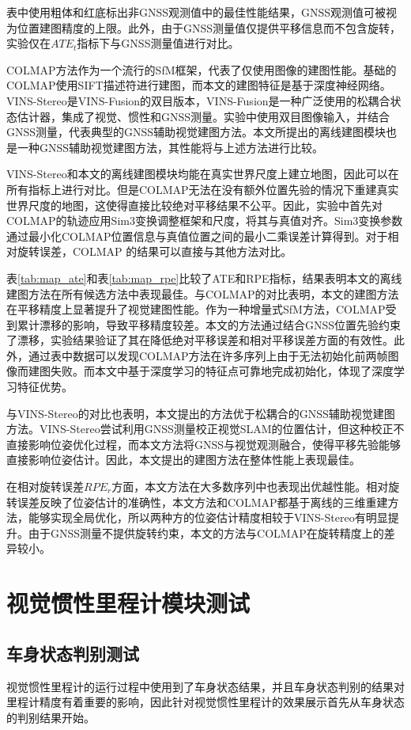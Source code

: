 表中使用粗体和红底标出非GNSS观测值中的最佳性能结果，GNSS观测值可被视为位置建图精度的上限。此外，由于GNSS测量值仅提供平移信息而不包含旋转，实验仅在$ATE_t$指标下与GNSS测量值进行对比。

COLMAP方法作为一个流行的SfM框架，代表了仅使用图像的建图性能。基础的COLMAP使用SIFT\cite{lowe2004distinctive}描述符进行建图，而本文的建图特征是基于深度神经网络。VINS-Stereo是VINS-Fusion的双目版本，VINS-Fusion是一种广泛使用的松耦合状态估计器，集成了视觉、惯性和GNSS测量。实验中使用双目图像输入，并结合GNSS测量，代表典型的GNSS辅助视觉建图方法。本文所提出的离线建图模块也是一种GNSS辅助视觉建图方法，其性能将与上述方法进行比较。

VINS-Stereo和本文的离线建图模块均能在真实世界尺度上建立地图，因此可以在所有指标上进行对比。但是COLMAP无法在没有额外位置先验的情况下重建真实世界尺度的地图，这使得直接比较绝对平移结果不公平。因此，实验中首先对COLMAP的轨迹应用Sim3变换调整框架和尺度，将其与真值对齐。Sim3变换参数通过最小化COLMAP位置信息与真值位置之间的最小二乘误差计算得到。对于相对旋转误差，COLMAP 的结果可以直接与其他方法对比。

表\ref{tab:map_ate}和表\ref{tab:map_rpe}比较了ATE和RPE指标，结果表明本文的离线建图方法在所有候选方法中表现最佳。与COLMAP的对比表明，本文的建图方法在平移精度上显著提升了视觉建图性能。作为一种增量式SfM方法，COLMAP受到累计漂移的影响，导致平移精度较差。本文的方法通过结合GNSS位置先验约束了漂移，实验结果验证了其在降低绝对平移误差和相对平移误差方面的有效性。此外，通过表中数据可以发现COLMAP方法在许多序列上由于无法初始化前两帧图像而建图失败。而本文中基于深度学习的特征点可靠地完成初始化，体现了深度学习特征优势。

与VINS-Stereo的对比也表明，本文提出的方法优于松耦合的GNSS辅助视觉建图方法。VINS-Stereo尝试利用GNSS测量校正视觉SLAM的位置估计，但这种校正不直接影响位姿优化过程，而本文方法将GNSS与视觉观测融合，使得平移先验能够直接影响位姿估计。因此，本文提出的建图方法在整体性能上表现最佳。

在相对旋转误差$RPE_r$方面，本文方法在大多数序列中也表现出优越性能。相对旋转误差反映了位姿估计的准确性，本文方法和COLMAP都基于离线的三维重建方法，能够实现全局优化，所以两种方的位姿估计精度相较于VINS-Stereo有明显提升。由于GNSS测量不提供旋转约束，本文的方法与COLMAP在旋转精度上的差异较小。

\section{视觉惯性里程计模块测试}

\subsection{车身状态判别测试}
视觉惯性里程计的运行过程中使用到了车身状态结果，并且车身状态判别的结果对里程计精度有着重要的影响，因此针对视觉惯性里程计的效果展示首先从车身状态的判别结果开始。

